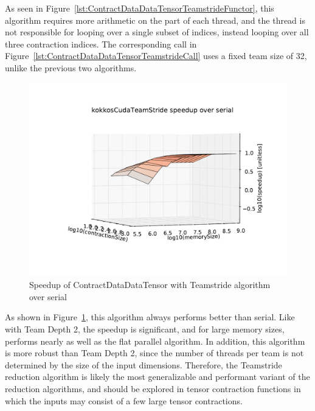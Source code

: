 As seen in Figure~\ref{lst:ContractDataDataTensorTeamstrideFunctor}, this
algorithm requires more arithmetic on the part of each thread, and the thread
is not responsible for looping over a single subset of indices, instead looping
over all three contraction indices. The corresponding call in
Figure~\ref{lst:ContractDataDataTensorTeamstrideCall} uses a fixed team size of
32, unlike the previous two algorithms.

\begin{figure}[ht]
    \includegraphics[scale=.55]{./VersusSerial_kokkosCudaTeamStride_clearCache_shadowfax.pdf}
\caption{Speedup of ContractDataDataTensor with Teamstride algorithm over
    serial
\label{fig:ContractDataDataTensorTeamstride}} 
\end{figure}

As shown in Figure~\ref{fig:ContractDataDataTensorTeamstride}, this algorithm
always performs better than serial.  Like with Team Depth 2, the speedup is
significant, and for large memory sizes, performs nearly as well as the flat
parallel algorithm.  In addition, this algorithm is more robust than Team Depth
2, since the number of threads per team is not determined by the size of the
input dimensions.  Therefore, the Teamstride reduction algorithm is likely the
most generalizable and performant variant of the reduction algorithms, and
should be explored in tensor contraction functions in which the inputs may
consist of a few large tensor contractions.

